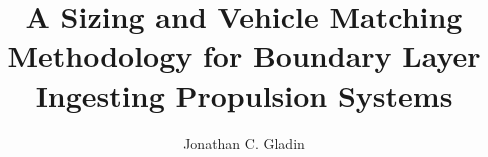 \documentclass[12pt]{gatech-thesis}
\title{A Sizing and Vehicle Matching Methodology for Boundary Layer Ingesting Propulsion Systems} %
\author{Jonathan C. Gladin}
\begin{document}
	
	
	
	\begin{preliminary}
	
		

		

		
	
		

		\contents
		
		

	\end{preliminary}

	

		

		

	

	

	

	

	
\nocite{*}
 
\begin{postliminary}
\end{postliminary}
\end{document}
